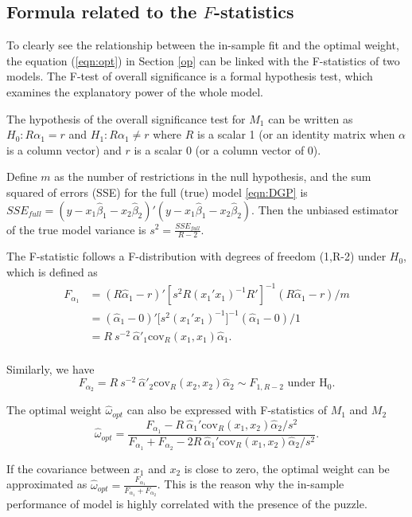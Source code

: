 \documentclass{monashthesis}
\begin{document}
\hypertarget{formula-related-to-the-f-statistics}{%
\subsection{\texorpdfstring{Formula related to the \(F\)-statistics}{Formula related to the F-statistics}}\label{formula-related-to-the-f-statistics}}

To clearly see the relationship between the in-sample fit and the optimal weight, the equation (\ref{eqn:opt}) in Section \ref{op} can be linked with the F-statistics of two models. The F-test of overall significance is a formal hypothesis test, which examines the explanatory power of the whole model.

The hypothesis of the overall significance test for \(M_1\) can be written as \(H_0: R\alpha_1 = r\) and \(H_1: R\alpha_1 \ne r\) where \(R\) is a scalar 1 (or an identity matrix when \(\alpha\) is a column vector) and \(r\) is a scalar 0 (or a column vector of 0).

Define \(m\) as the number of restrictions in the null hypothesis, and the sum squared of errors (SSE) for the full (true) model \ref{eqn:DGP} is \(SSE_{full} = (y - x_1 \hat\beta_1 - x_2 \hat\beta_2)'(y - x_1 \hat\beta_1 - x_2 \hat\beta_2)\). Then the unbiased estimator of the true model variance is \(s^2=\frac{SSE_{full}}{R-2}\).

The F-statistic follows a F-distribution with degrees of freedom (1,R-2) under \(H_0\), which is defined as
\begin{align*}
F_{\alpha_1} &= (R\hat\alpha_1 - r)'[s^2R(x_1'x_1)^{-1}R']^{-1}(R\hat\alpha_1 - r)/m \\
&= (\hat\alpha_1 - 0)' \Big[s^2(x_1'x_1)^{-1}\Big]^{-1} (\hat\alpha_1 - 0)/1 \\
&= R \ s^{-2} \ \hat\alpha'_1 \text{cov}_R(x_1,x_1) \hat\alpha_1. \\
\end{align*}

Similarly, we have
\begin{equation*}
F_{\alpha_2} = R \ s^{-2} \ \hat\alpha'_2 \text{cov}_R(x_2,x_2) \hat\alpha_2 \sim F_{1,R-2} \text{ under  H}_0.
\end{equation*}

The optimal weight \(\hat\omega_{opt}\) can also be expressed with F-statistics of \(M_1\) and \(M_2\)
\begin{equation*}
\hat\omega_{opt} = \frac{F_{\alpha_1}- R \ \hat\alpha_1'\text{cov}_R(x_1,x_2)\hat\alpha_2/s^2}{F_{\alpha_1} + F_{\alpha_2} - 2 R \ \hat\alpha_1'\text{cov}_R(x_1,x_2)\hat\alpha_2/s^2}.
\end{equation*}

If the covariance between \(x_1\) and \(x_2\) is close to zero, the optimal weight can be approximated as \(\hat\omega_{opt} = \frac{F_{\alpha_1}}{F_{\alpha_1} + F_{\alpha_2}}\). This is the reason why the in-sample performance of model is highly correlated with the presence of the puzzle.

\printbibliography[title={Reference}]
\end{document}
